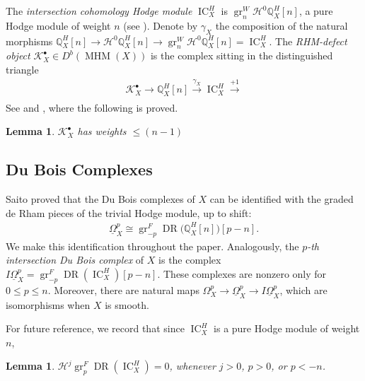 \documentclass[11pt]{amsart}
\newtheorem{lemma}[equation]{Lemma}
\theoremstyle{definition}
\theoremstyle{plain}
\DeclareMathOperator{\gr}{gr}
\DeclareMathOperator{\MHM}{MHM}
\DeclareMathOperator{\dr}{DR}
\DeclareMathOperator{\ic}{IC}
\begin{document}
The \emph{intersection cohomology Hodge module} $\ic_X^H$ is $\gr_n^W \mathcal{H}^0 \mathbb{Q}_X^H[n]$, a pure Hodge module  of weight $n$ (see \cite[$4.5$]{saito 90}). Denote by $\gamma_X$ the composition of the natural morphisms $\mathbb{Q}_X^H[n] \rightarrow \mathcal{H}^0 \mathbb{Q}_X^H[n] \rightarrow \gr_n^W \mathcal{H}^0 \mathbb{Q}_X^H[n] = \ic_X^H$. The \emph{RHM-defect object} $\mathcal{K}_X^\bullet \in D^b(\MHM(X))$ is the complex sitting in the distinguished triangle
\begin{align}\label{eqn rhm triangle}
    \mathcal{K}_X^\bullet \rightarrow \mathbb{Q}_X^H[n] \xrightarrow[]{\gamma_X} \ic_X^H \xrightarrow[]{+1}
\end{align}
See \cite[Definition $6.1$]{popa park lefschetz} and \cite[Proposition $6.4$]{popa park lefschetz}, where the following is proved.

\begin{lemma}\label{lemma wt n-1}
$\mathcal{K}_X^\bullet$ has weights $\leq (n-1)$
\end{lemma}


\subsection{Du Bois Complexes}

Saito \cite[Theorem $0.2$]{saito hodge complexes} proved that the Du Bois complexes of $X$ can be identified with the graded de Rham pieces of the trivial Hodge module, up to shift:
\begin{align*}
    \underline{\Omega}_X^p \cong \gr_{-p}^F \dr \big( \mathbb{Q}_X^H[n] \big) [p-n].
\end{align*}
We make this identification throughout the paper. Analogously, the \emph{$p$-th intersection Du Bois complex} \cite{psv} of $X$ is the complex $I \underline{\Omega}_X^p = \gr_{-p}^F \dr( \ic_X^H )[p-n]$. These complexes are nonzero only for $0 \leq p \leq n$. Moreover, there are natural maps $\Omega_X^p \rightarrow \underline{\Omega}_X^p \rightarrow I \underline{\Omega}_X^p$, which are isomorphisms when $X$ is smooth.

For future reference, we record that since $\ic_X^H$ is a pure Hodge module of weight $n$,
\begin{lemma}\label{lem ic vanishing}
    $\mathcal{H}^j \gr_p^F \dr ( \ic_X^H ) = 0$, whenever $j > 0$, $p > 0$, or $p < -n$.
\end{lemma}
\end{document}
